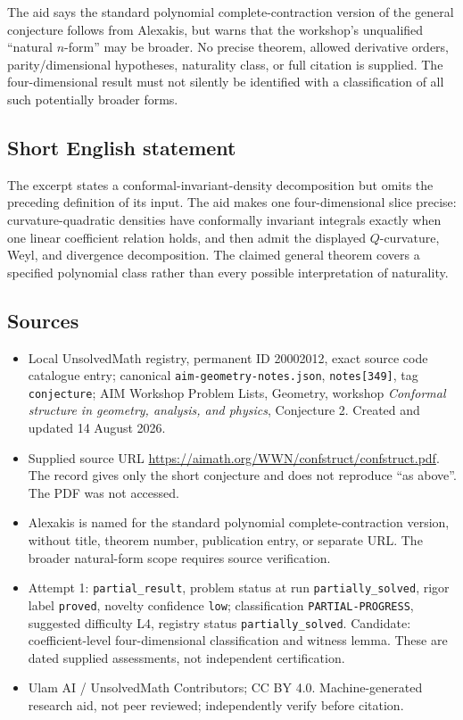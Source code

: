 \documentclass[11pt]{article}
\begin{document}
The aid says the standard polynomial complete-contraction version of the general conjecture follows from Alexakis, but warns that the workshop's unqualified ``natural \(n\)-form'' may be broader. No precise theorem, allowed derivative orders, parity/dimensional hypotheses, naturality class, or full citation is supplied. The four-dimensional result must not silently be identified with a classification of all such potentially broader forms.
\subsection{Short English statement}
The excerpt states a conformal-invariant-density decomposition but omits the preceding definition of its input. The aid makes one four-dimensional slice precise: curvature-quadratic densities have conformally invariant integrals exactly when one linear coefficient relation holds, and then admit the displayed \(Q\)-curvature, Weyl, and divergence decomposition. The claimed general theorem covers a specified polynomial class rather than every possible interpretation of naturality.
\subsection{Sources}
\begin{itemize}
\item Local UnsolvedMath registry, permanent ID 20002012, exact source code catalogue entry; canonical \texttt{aim-geometry-notes.json}, \texttt{notes[349]}, tag \texttt{conjecture}; AIM Workshop Problem Lists, Geometry, workshop \emph{Conformal structure in geometry, analysis, and physics}, Conjecture 2. Created and updated 14 August 2026.
\item Supplied source URL \url{https://aimath.org/WWN/confstruct/confstruct.pdf}. The record gives only the short conjecture and does not reproduce ``as above''. The PDF was not accessed.
\item Alexakis is named for the standard polynomial complete-contraction version, without title, theorem number, publication entry, or separate URL. The broader natural-form scope requires source verification.
\item Attempt 1: \texttt{partial\_result}, problem status at run \texttt{partially\_solved}, rigor label \texttt{proved}, novelty confidence \texttt{low}; classification \texttt{PARTIAL-PROGRESS}, suggested difficulty L4, registry status \texttt{partially\_solved}. Candidate: coefficient-level four-dimensional classification and witness lemma. These are dated supplied assessments, not independent certification.
\item Ulam AI / UnsolvedMath Contributors; CC BY 4.0. Machine-generated research aid, not peer reviewed; independently verify before citation.
\end{itemize}
\end{document}
